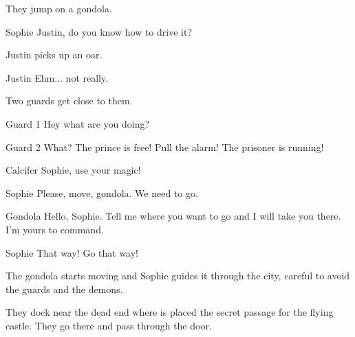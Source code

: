 \begin{screenplay}
They jump on a gondola.

\begin{dialogue}{Sophie}
Justin, do you know how to drive it?
\end{dialogue}

Justin picks up an oar.

\begin{dialogue}{Justin}
Ehm... not really.
\end{dialogue}

Two guards get close to them.

\begin{dialogue}{Guard 1}
Hey what are you doing?
\end{dialogue}

\begin{dialogue}[screaming]{Guard 2}
What? The prince is free! Pull the alarm! The prisoner is running!
\end{dialogue}

\begin{dialogue}[worried]{Calcifer}
Sophie, use your magic!
\end{dialogue}

\begin{dialogue}[in a hurry]{Sophie}
Please, move, gondola. We need to go.
\end{dialogue}

\begin{dialogue}{Gondola}
Hello, Sophie. Tell me where you want to go and I will take you there. I’m yours to command.
\end{dialogue}

\begin{dialogue}[in a hurry]{Sophie}
That way! Go that way!
\end{dialogue}

\end{screenplay}
\vspace{1em}

The gondola starts moving and Sophie guides it through the city, careful to avoid the guards and the demons.

They dock near the dead end where is placed the secret passage for the flying castle. They go there and pass through the door.
